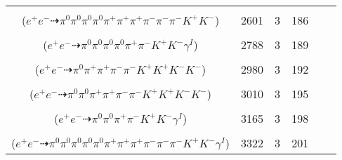 \documentclass[landscape]{article}
\newcounter{rownumbers}
\newcommand\rn{\stepcounter{rownumbers}\arabic{rownumbers}}
\newcommand{\EOL}{\\} %
\newcommand{\topoTags}[1]{#1} %
\begin{document}
\begin{longtable}{clcccc}
\rn & \makecell[l]{ $ 
e^{+} e^{-} \rightarrow \pi^{0} \pi^{0} \pi^{0} \rho^{0} \pi^{+} \pi^{-} \omega K^{+} K^{-} ,
\rho^{0} \rightarrow \pi^{+} \pi^{-} ,
\omega \rightarrow \pi^{0} \pi^{+} \pi^{-} 
$ \\ ($
e^{+} e^{-} \dashrightarrow \pi^{0} \pi^{0} \pi^{0} \pi^{0} \pi^{+} \pi^{+} \pi^{+} \pi^{-} \pi^{-} \pi^{-} K^{+} K^{-} 
$) } & \topoTags{2601 & }3 & 186 \EOL

\rn & \makecell[l]{ $ 
e^{+} e^{-} \rightarrow \pi^{0} \pi^{0} \pi^{-} \rho^{+} K^{-} K^{*+} \gamma^{I} ,
\rho^{+} \rightarrow \pi^{0} \pi^{+} ,
K^{*+} \rightarrow \pi^{0} K^{+} 
$ \\ ($
e^{+} e^{-} \dashrightarrow \pi^{0} \pi^{0} \pi^{0} \pi^{0} \pi^{+} \pi^{-} K^{+} K^{-} \gamma^{I} 
$) } & \topoTags{2788 & }3 & 189 \EOL

\rn & \makecell[l]{ $ 
e^{+} e^{-} \rightarrow \pi^{0} \pi^{+} \pi^{-} \pi^{-} \bar{K}^{*} K^{+} K^{+} K^{-} ,
\bar{K}^{*} \rightarrow \pi^{+} K^{-} 
$ \\ ($
e^{+} e^{-} \dashrightarrow \pi^{0} \pi^{+} \pi^{+} \pi^{-} \pi^{-} K^{+} K^{+} K^{-} K^{-} 
$) } & \topoTags{2980 & }3 & 192 \EOL

\rn & \makecell[l]{ $ 
e^{+} e^{-} \rightarrow \rho^{-} \eta \bar{K}^{*} K^{+} \phi ,
\rho^{-} \rightarrow \pi^{0} \pi^{-} ,
\eta \rightarrow \pi^{0} \pi^{+} \pi^{-} ,
\bar{K}^{*} \rightarrow \pi^{+} K^{-} ,
\phi \rightarrow K^{+} K^{-} 
$ \\ ($
e^{+} e^{-} \dashrightarrow \pi^{0} \pi^{0} \pi^{+} \pi^{+} \pi^{-} \pi^{-} K^{+} K^{+} K^{-} K^{-} 
$) } & \topoTags{3010 & }3 & 195 \EOL

\rn & \makecell[l]{ $ 
e^{+} e^{-} \rightarrow \pi^{0} \pi^{0} \pi^{+} \pi^{-} K^{+} K^{-} \gamma^{I} 
$ \\ ($
e^{+} e^{-} \dashrightarrow \pi^{0} \pi^{0} \pi^{+} \pi^{-} K^{+} K^{-} \gamma^{I} 
$) } & \topoTags{3165 & }3 & 198 \EOL

\rn & \makecell[l]{ $ 
e^{+} e^{-} \rightarrow \pi^{0} \pi^{0} \pi^{-} \rho^{+} \rho^{-} \omega \bar{K}^{*} K^{+} \gamma^{I} ,
\rho^{+} \rightarrow \pi^{0} \pi^{+} ,
\rho^{-} \rightarrow \pi^{0} \pi^{-} ,
\omega \rightarrow \pi^{0} \pi^{+} \pi^{-} ,
\bar{K}^{*} \rightarrow \pi^{+} K^{-} 
$ \\ ($
e^{+} e^{-} \dashrightarrow \pi^{0} \pi^{0} \pi^{0} \pi^{0} \pi^{0} \pi^{+} \pi^{+} \pi^{+} \pi^{-} \pi^{-} \pi^{-} K^{+} K^{-} \gamma^{I} 
$) } & \topoTags{3322 & }3 & 201 \EOL


\end{longtable}
\end{document}
